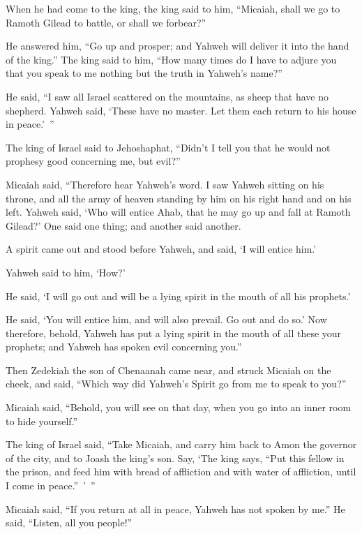 {\par }{\PP {}When he had come to the king, the king said to him, “Micaiah, shall we go to Ramoth Gilead to battle, or shall we forbear?”
\par }{\PP He answered him, “Go up and prosper; and Yahweh will deliver it into the hand of the king.”
The king said to him, “How many times do I have to adjure you that you speak to me nothing but the truth in Yahweh’s name?”
\par }{\PP {}He said, “I saw all Israel scattered on the mountains, as sheep that have no shepherd. Yahweh said, ‘These have no master. Let them each return to his house in peace.’ ”
\par }{\PP {}The king of Israel said to Jehoshaphat, “Didn’t I tell you that he would not prophesy good concerning me, but evil?”
\par }{\PP {}Micaiah said, “Therefore hear Yahweh’s word. I saw Yahweh sitting on his throne, and all the army of heaven standing by him on his right hand and on his left.
Yahweh said, ‘Who will entice Ahab, that he may go up and fall at Ramoth Gilead?’ One said one thing; and another said another.
\par }{\PP {}A spirit came out and stood before Yahweh, and said, ‘I will entice him.’
\par }{\PP {}Yahweh said to him, ‘How?’
\par }{\PP He said, ‘I will go out and will be a lying spirit in the mouth of all his prophets.’
\par }{\PP He said, ‘You will entice him, and will also prevail. Go out and do so.’
Now therefore, behold, Yahweh has put a lying spirit in the mouth of all these your prophets; and Yahweh has spoken evil concerning you.”
\par }{\PP {}Then Zedekiah the son of Chenaanah came near, and struck Micaiah on the cheek, and said, “Which way did Yahweh’s Spirit go from me to speak to you?”
\par }{\PP {}Micaiah said, “Behold, you will see on that day, when you go into an inner room to hide yourself.”
\par }{\PP {}The king of Israel said, “Take Micaiah, and carry him back to Amon the governor of the city, and to Joash the king’s son.
Say, ‘The king says, “Put this fellow in the prison, and feed him with bread of affliction and with water of affliction, until I come in peace.” ’ ”
\par }{\PP {}Micaiah said, “If you return at all in peace, Yahweh has not spoken by me.” He said, “Listen, all you people!”
}
